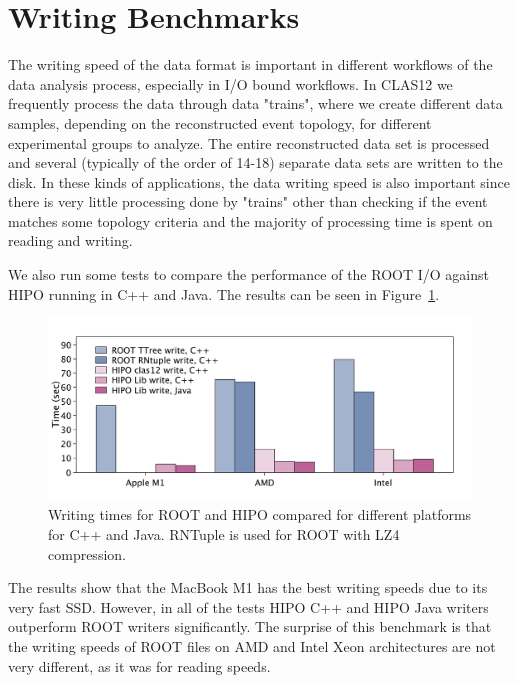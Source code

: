 \documentclass[preprint,12pt]{elsarticle}
\begin{document}
 \section{Writing Benchmarks}

The writing speed of the data format is important in different workflows of the data analysis process, especially in I/O bound workflows.
In CLAS12 we frequently process the data through data "trains", where we create different data samples, depending on the reconstructed event topology,
for different experimental groups to analyze. The entire reconstructed data set is processed and several (typically of the order of 14-18) separate data sets 
are written to the disk. In these kinds of applications, the data writing speed is also important since there is very little processing done by "trains" other
than checking if the event matches some topology criteria and the majority of processing time is spent on reading and writing.

We also run some tests to compare the performance of the ROOT I/O against HIPO running in C++ and Java. The results can be 
seen in Figure~\ref{benchmark:write}.

  \begin{figure}[!h]
\begin{center}
  \includegraphics[width=5.0in]{bench_root_vs_hipo_write.pdf}
 \caption { Writing times for ROOT and HIPO compared for different platforms for C++ and Java. RNTuple is used for ROOT with LZ4 compression.}
 \label{benchmark:write}
 \end{center}
  \end{figure}
  
The results show that the MacBook M1 has the best writing speeds due to its very fast SSD. However, in all of the tests
HIPO C++ and HIPO Java writers outperform ROOT writers significantly. The surprise of this benchmark is that the writing 
speeds of ROOT files on AMD and Intel Xeon architectures are not very different, as it was for reading speeds.
\end{document}
